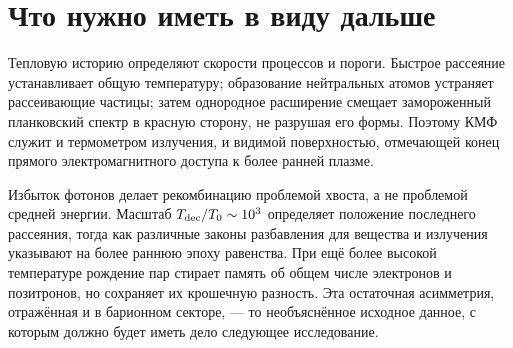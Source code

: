 \section{Что нужно иметь в виду дальше}

Тепловую историю определяют скорости процессов и пороги. Быстрое рассеяние устанавливает общую температуру; образование нейтральных атомов устраняет рассеивающие частицы; затем однородное расширение смещает замороженный планковский спектр в красную сторону, не разрушая его формы. Поэтому КМФ служит и термометром излучения, и видимой поверхностью, отмечающей конец прямого электромагнитного доступа к более ранней плазме.

Избыток фотонов делает рекомбинацию проблемой хвоста, а не проблемой средней энергии. Масштаб \(T_{\rm dec}/T_0\sim10^3\) определяет положение последнего рассеяния, тогда как различные законы разбавления для вещества и излучения указывают на более раннюю эпоху равенства. При ещё более высокой температуре рождение пар стирает память об общем числе электронов и позитронов, но сохраняет их крошечную разность. Эта остаточная асимметрия, отражённая и в барионном секторе, — то необъяснённое исходное данное, с которым должно будет иметь дело следующее исследование.